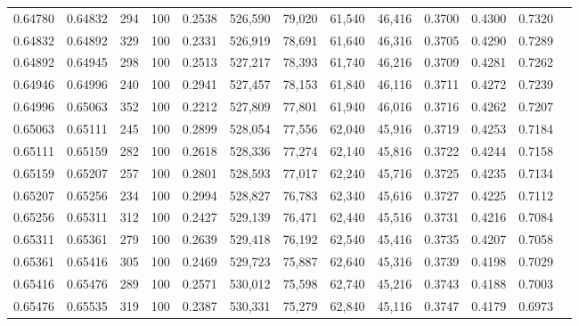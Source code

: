 \begin{tabular}{rrrrrrrrrrrrr}
0.64780 & 0.64832 &   294 & 100 &                                     0.2538 & 526,590 &  79,020 &  61,540 &  46,416 & 0.3700 & 0.4300 & 0.7320 \\
0.64832 & 0.64892 &   329 & 100 &                                     0.2331 & 526,919 &  78,691 &  61,640 &  46,316 & 0.3705 & 0.4290 & 0.7289 \\
0.64892 & 0.64945 &   298 & 100 &                                     0.2513 & 527,217 &  78,393 &  61,740 &  46,216 & 0.3709 & 0.4281 & 0.7262 \\
0.64946 & 0.64996 &   240 & 100 &                                     0.2941 & 527,457 &  78,153 &  61,840 &  46,116 & 0.3711 & 0.4272 & 0.7239 \\
0.64996 & 0.65063 &   352 & 100 &                                     0.2212 & 527,809 &  77,801 &  61,940 &  46,016 & 0.3716 & 0.4262 & 0.7207 \\
0.65063 & 0.65111 &   245 & 100 &                                     0.2899 & 528,054 &  77,556 &  62,040 &  45,916 & 0.3719 & 0.4253 & 0.7184 \\
0.65111 & 0.65159 &   282 & 100 &                                     0.2618 & 528,336 &  77,274 &  62,140 &  45,816 & 0.3722 & 0.4244 & 0.7158 \\
0.65159 & 0.65207 &   257 & 100 &                                     0.2801 & 528,593 &  77,017 &  62,240 &  45,716 & 0.3725 & 0.4235 & 0.7134 \\
0.65207 & 0.65256 &   234 & 100 &                                     0.2994 & 528,827 &  76,783 &  62,340 &  45,616 & 0.3727 & 0.4225 & 0.7112 \\
0.65256 & 0.65311 &   312 & 100 &                                     0.2427 & 529,139 &  76,471 &  62,440 &  45,516 & 0.3731 & 0.4216 & 0.7084 \\
0.65311 & 0.65361 &   279 & 100 &                                     0.2639 & 529,418 &  76,192 &  62,540 &  45,416 & 0.3735 & 0.4207 & 0.7058 \\
0.65361 & 0.65416 &   305 & 100 &                                     0.2469 & 529,723 &  75,887 &  62,640 &  45,316 & 0.3739 & 0.4198 & 0.7029 \\
0.65416 & 0.65476 &   289 & 100 &                                     0.2571 & 530,012 &  75,598 &  62,740 &  45,216 & 0.3743 & 0.4188 & 0.7003 \\
0.65476 & 0.65535 &   319 & 100 &                                     0.2387 & 530,331 &  75,279 &  62,840 &  45,116 & 0.3747 & 0.4179 & 0.6973 \\

\end{tabular}
